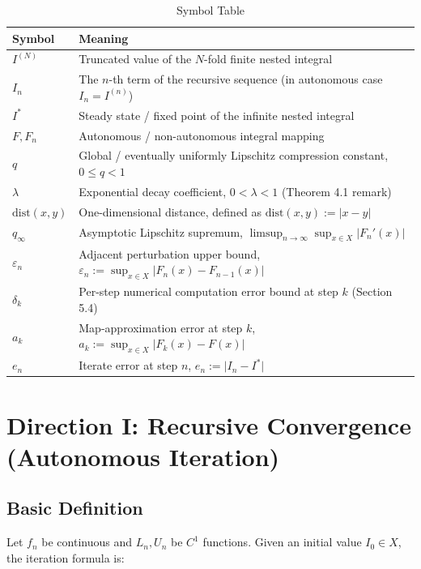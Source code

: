 \documentclass[11pt,a4paper]{amsart}
\begin{document}
\begin{table}[htbp]
\centering
\caption{Symbol Table}
\begin{tabularx}{\linewidth}{@{}lX@{}}
\toprule
\textbf{Symbol} & \textbf{Meaning} \\
\midrule
$I^{(N)}$ & Truncated value of the $N$-fold finite nested integral \\
$I_n$ & The $n$-th term of the recursive sequence (in autonomous case $I_n = I^{(n)}$) \\
$I^*$ & Steady state / fixed point of the infinite nested integral \\
$F, F_n$ & Autonomous / non-autonomous integral mapping \\
$q$ & Global / eventually uniformly Lipschitz compression constant, $0 \le q < 1$ \\
$\lambda$ & Exponential decay coefficient, $0 < \lambda < 1$ (Theorem 4.1 remark) \\
$\mathrm{dist}(x,y)$ & One-dimensional distance, defined as $\mathrm{dist}(x,y) := \lvert x - y\rvert$ \\
$q_\infty$ & Asymptotic Lipschitz supremum, $\limsup_{n\to\infty} \sup_{x\in X} \lvert F_n'(x)\rvert$ \\
$\varepsilon_n$ & Adjacent perturbation upper bound, $\varepsilon_n := \sup_{x\in X} \lvert F_n(x) - F_{n-1}(x)\rvert$ \\
$\delta_k$ & Per-step numerical computation error bound at step $k$ (Section 5.4) \\
$a_k$ & Map-approximation error at step $k$, $a_k := \sup_{x\in X} \lvert F_k(x) - F(x)\rvert$ \\
$e_n$ & Iterate error at step $n$, $e_n := \lvert I_n - I^*\rvert$ \\
\bottomrule
\end{tabularx}
\end{table}

\section{Direction I: Recursive Convergence (Autonomous Iteration)}

\subsection{Basic Definition}

Let $f_n$ be continuous and $L_n, U_n$ be $C^1$ functions. Given an initial value $I_0 \in X$, the iteration formula is:
\end{document}
